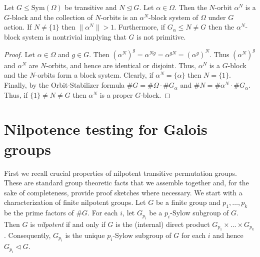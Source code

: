 \documentclass{llncs}
\newcommand{\Sym}[1]{{\ensuremath{\mathrm{Sym}\left(#1\right)}}}
\begin{document}
\begin{lemma}\label{lem-orbit-normal}
  Let $G\leq\Sym{\Omega}$ be transitive and $N\unlhd G$. Let
  $\alpha\in\Omega$. Then the $N$-orbit $\alpha^N$ is a $G$-block and
  the collection of $N$-orbits is an $\alpha^N$-block system of
  $\Omega$ under $G$ action. If $N\neq\{ 1 \}$ then $\|\alpha^N\|>1$.
  Furthermore, if $G_\alpha\leq N\neq G$ then the $\alpha^N$-block
  system is nontrivial implying that $G$ is not primitive.
\end{lemma}
\begin{proof}
  Let $\alpha\in\Omega$ and $g \in G$. Then $(\alpha^N)^g =
  \alpha^{Ng} = \alpha^{gN} = (\alpha^g)^N$. Thus $(\alpha^N)^g$ and
  $\alpha^N$ are $N$-orbits, and hence are identical or disjoint.
  Thus, $\alpha^N$ is a $G$-block and the $N$-orbits form a block
  system. Clearly, if $\alpha^N = \{ \alpha \}$ then $N=\{1\}$.
  Finally, by the Orbit-Stabilizer formula $\# G=\#\Omega\cdot\#
  G_\alpha$ and $\# N=\#\alpha^N\cdot\# G_\alpha$.  Thus, if
  $\{1\}\neq N\neq G$ then $\alpha^N$ is a proper $G$-block.
\end{proof}

\section{Nilpotence testing for Galois groups}

First we recall crucial properties of nilpotent transitive permutation
groups. These are standard group theoretic facts that we assemble
together and, for the sake of completeness, provide proof sketches
where necessary. We start with a characterization of finite nilpotent
groups. Let $G$ be a finite group and $p_1,\ldots,p_k$ be the prime
factors of $\#G$. For each $i$, let $G_{p_i}$ be a $p_i$-Sylow
subgroup of $G$. Then $G$ is \emph{nilpotent} if and only if $G$ is
the (internal) direct product $G_{p_1}\times\ldots \times G_{p_k}$.
Consequently, $G_{p_i}$ is the unique $p_i$-Sylow subgroup of $G$ for
each $i$ and hence $G_{p_i}\lhd G$.
\end{document}
